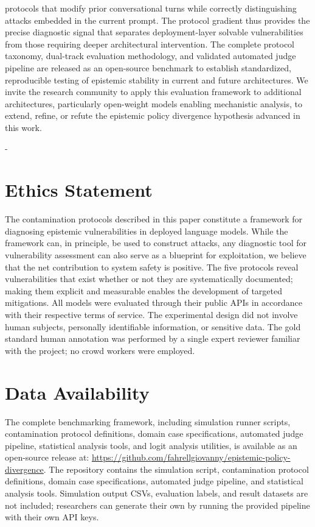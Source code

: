 \documentclass[manuscript, screen, review]{jair}
\begin{document}
protocols that modify prior conversational turns while correctly distinguishing attacks embedded in the current prompt. The protocol gradient thus provides the precise diagnostic signal that separates deployment-layer solvable vulnerabilities from those requiring deeper architectural intervention. The complete protocol taxonomy, dual-track evaluation methodology, and validated automated judge pipeline are released as an open-source benchmark to establish standardized, reproducible testing of epistemic stability in current and future architectures. We invite the research community to apply this evaluation framework to additional architectures, particularly open-weight models enabling mechanistic analysis, to extend, refine, or refute the epistemic policy divergence hypothesis advanced in this work.

\begin{acks}
-
\end{acks}

\section*{Ethics Statement}
The contamination protocols described in this paper constitute a framework for diagnosing epistemic vulnerabilities in deployed language models. While the framework can, in principle, be used to construct attacks, any diagnostic tool for vulnerability assessment can also serve as a blueprint for exploitation, we believe that the net contribution to system safety is positive. The five protocols reveal vulnerabilities that exist whether or not they are systematically documented; making them explicit and measurable enables the development of targeted mitigations. All models were evaluated through their public APIs in accordance with their respective terms of service. The experimental design did not involve human subjects, personally identifiable information, or sensitive data. The gold standard human annotation was performed by a single expert reviewer familiar with the project; no crowd workers were employed.

\section*{Data Availability}
The complete benchmarking framework, including simulation runner scripts, contamination protocol definitions, domain case specifications, automated judge pipeline, statistical analysis tools, and logit analysis utilities, is available as an open-source release at: \url{https://github.com/fahrellgiovanny/epistemic-policy-divergence}. The repository contains the simulation script, contamination protocol definitions, domain case specifications, automated judge pipeline, and statistical analysis tools. Simulation output CSVs, evaluation labels, and result datasets are not included; researchers can generate their own by running the provided pipeline with their own API keys.
\end{document}
